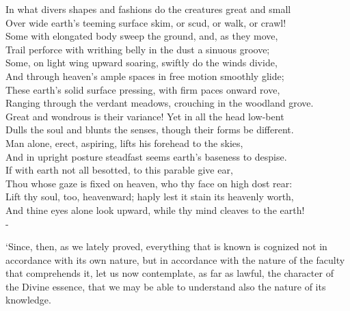\documentclass[12pt]{book}
\newenvironment{ipoem}[1]%
  {\setcounter{poemindentevery}{#1}\begin{poem}\small}%
  {\end{poem}\setcounter{poemindentevery}{0}}
\begin{document}
\begin{ipoem}{0}
    In what divers shapes and fashions do the creatures great and small \\
    Over wide earth's teeming surface skim, or scud, or walk, or crawl! \\
    Some with elongated body sweep the ground, and, as they move, \\
    Trail perforce with writhing belly in the dust a sinuous groove; \\
    Some, on light wing upward soaring, swiftly do the winds divide, \\
    And through heaven's ample spaces in free motion smoothly glide; \\
    These earth's solid surface pressing, with firm paces onward rove, \\
    Ranging through the verdant meadows, crouching in the woodland grove. \\
    Great and wondrous is their variance! Yet in all the head low-bent \\
    Dulls the soul and blunts the senses, though their forms be different. \\
    Man alone, erect, aspiring, lifts his forehead to the skies, \\
    And in upright posture steadfast seems earth's baseness to despise. \\
    If with earth not all besotted, to this parable give ear, \\
    Thou whose gaze is fixed on heaven, who thy face on high dost rear: \\
    Lift thy soul, too, heavenward; haply lest it stain its heavenly worth, \\
    And thine eyes alone look upward, while thy mind cleaves to the earth! \\-
\end{ipoem}

`Since, then, as we lately proved, everything that is known is cognized
not in accordance with its own nature, but in accordance with the nature
of the faculty that comprehends it, let us now contemplate, as far as
lawful, the character of the Divine essence, that we may be able to
understand also the nature of its knowledge.
\end{document}

